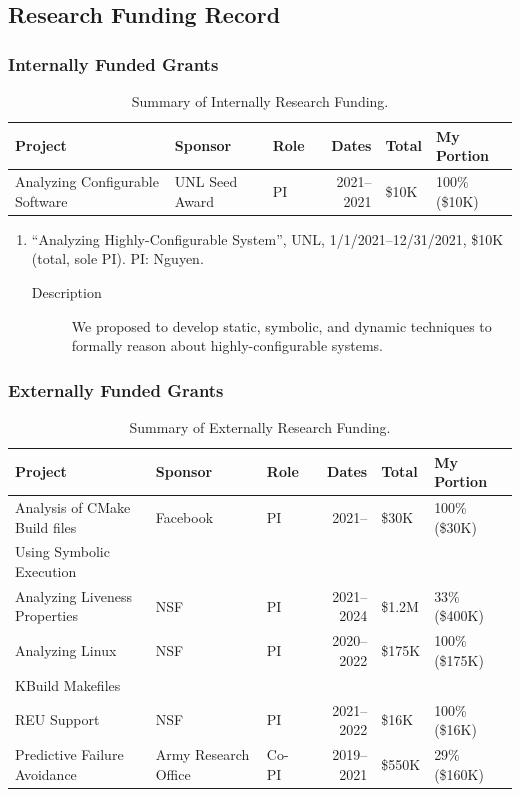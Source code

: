 \documentclass[11pt]{article}
\begin{document}
\subsection{Research Funding Record}

\subsubsection{Internally Funded Grants}
\begin{table}[htbp]
  \caption{\label{tab:internalfunding}Summary of Internally Research Funding.}
  \small
  \centering
  \begin{tabular}{lllrll}
    \toprule
    Project & Sponsor & Role & Dates & Total & My Portion\\
    \midrule
    Analyzing Configurable Software   & UNL Seed Award & PI & 2021--2021 & \$10K & 100\% (\$10K)\\
    \bottomrule
  \end{tabular}
\end{table}

\begin{enumerate}
\item ``Analyzing Highly-Configurable System'', UNL, 1/1/2021--12/31/2021, \$10K (total, sole PI). PI: Nguyen.
  \begin{description}
  \item[Description] We proposed to develop static, symbolic, and dynamic techniques to formally reason about highly-configurable systems.  
  \end{description}
\end{enumerate}

\subsubsection{Externally Funded Grants}

\begin{table}[htbp]
  \caption{\label{tab:externalfunding}Summary of Externally Research Funding.}
  \small
  \centering
  \begin{tabular}{lllrll}
    \toprule
    Project & Sponsor & Role & Dates & Total & My Portion\\
    \midrule
    Analysis of CMake Build files & Facebook & PI & 2021-- & \$30K & 100\% (\$30K)\\
    Using Symbolic Execution &&&&&\\
    \midrule
    Analyzing Liveness Properties & NSF & PI & 2021--2024 & \$1.2M & 33\% (\$400K)\\
    \midrule
    Analyzing Linux & NSF & PI & 2020--2022 & \$175K & 100\% (\$175K)\\
    KBuild Makefiles &  &  &  &  & \\
    REU Support & NSF & PI & 2021--2022 & \$16K & 100\% (\$16K)\\
    \midrule
    Predictive Failure Avoidance & Army Research Office & Co-PI & 2019--2021 & \$550K & 29\% (\$160K)\\
    \bottomrule
  \end{tabular}
\end{table}
\end{document}
